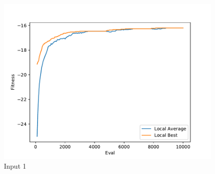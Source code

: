 \documentclass{standalone}
\begin{document}
\begin{figure}[!htb]
	\caption{Input 1}
	\label{fig:graph_1003}
	\includegraphics[width=\textwidth]{../graphs/graphs/1003.pdf}
\end{figure}
\end{document}
